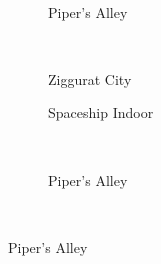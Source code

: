\begin{figure}[t]
\begin{minipage}[t]{0.5\textwidth}
\begin{adjustbox}{minipage=\textwidth, scale=0.55}
\begin{subfigure}[b]{1.6\textwidth}
      \label{fig:hs-ns-memory:indoor}
    \end{subfigure}
  \end{adjustbox} \\
  \begin{adjustbox}{minipage=\textwidth, scale=0.55}
    \begin{subfigure}[b]{1.6\textwidth}
      \centering
      \def\svgwidth{\textwidth}
      
      \caption{Piper's Alley}
      \vspace{4pt}
      \label{fig:hs-ns-memory:alley}
    \end{subfigure}
  \end{adjustbox} \\
  \begin{adjustbox}{minipage=\textwidth, scale=0.55}
    \begin{subfigure}[b]{1.6\textwidth}
      \centering
      \def\svgwidth{\textwidth}
      
      \caption{Ziggurat City}
      \label{fig:hs-ns-memory:city}
    \end{subfigure}
  \end{adjustbox}
  \caption{\small Aantal pixels.}
  \label{fig:hs-ns-memory}
  \end{minipage}%
  \begin{minipage}[t]{0.5\textwidth}
  \begin{adjustbox}{minipage=\textwidth, scale=0.55}
    \begin{subfigure}[b]{1.6\textwidth}
      \centering
      \def\svgwidth{\textwidth}
      
      \caption{Spaceship Indoor}
      \vspace{4pt}
      \label{fig:hs-ns-light-indices:indoor}
    \end{subfigure}
  \end{adjustbox} \\
  \begin{adjustbox}{minipage=\textwidth, scale=0.55}
    \begin{subfigure}[b]{1.6\textwidth}
      \centering
      \def\svgwidth{\textwidth}
      
      \caption{Piper's Alley}
      \vspace{4pt}
      \label{fig:hs-ns-light-indices:alley}
    \end{subfigure}
  \end{adjustbox} \\

\end{minipage}
\end{figure}
